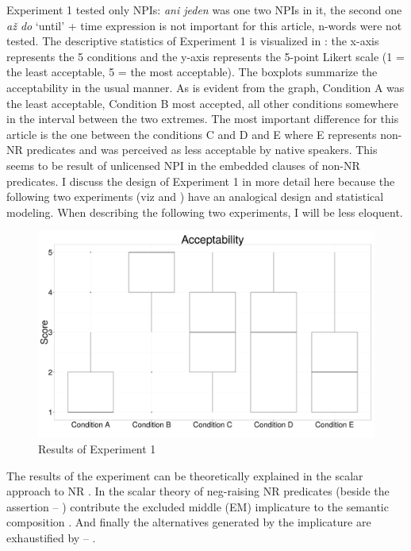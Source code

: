 \documentclass[output=paper,
]{langscibook}
\begin{document}
\noindent Experiment 1 tested only NPIs: \textit{ani jeden} was one two NPIs in it, the second one \textit{až do} `until' + time expression is not important for this article, n-words were not tested. The descriptive statistics of Experiment 1 is visualized in : the x-axis represents the 5 conditions and the y-axis represents the 5-point Likert scale (1 = the least acceptable, 5 = the most acceptable). The boxplots summarize the acceptability in the usual manner. As is evident from the graph, Condition A was the least acceptable, Condition B most accepted, all other conditions somewhere in the interval between the two extremes. The most important difference for this article is the one between the conditions C and D and E where E represents non-NR predicates and was perceived as less acceptable by native speakers. This seems to be result of unlicensed NPI in the embedded clauses of non-NR predicates. I discuss the design of Experiment 1 in more detail here because the following two experiments (viz  and ) have an analogical design and statistical modeling. When describing the following two experiments, I will be less eloquent.

\begin{figure}
\label{fig1_stat}
\centering
\includegraphics[scale=0.22]{figures/boxplot-exp1.png}
\caption{Results of Experiment 1}
\end{figure}


The results of the experiment can be theoretically explained in the scalar approach to NR \citep{horn1973semantic,romoli2012soft,romoli2013scalar}. In the scalar theory of neg-raising  NR predicates (beside the assertion -- ) contribute the  excluded middle (EM) implicature to the semantic composition . And finally the   alternatives generated by the implicature are exhaustified by  -- .
\end{document}
